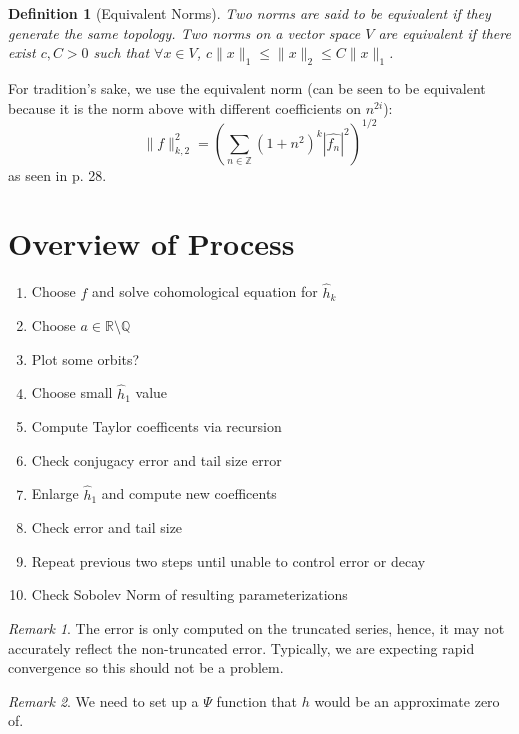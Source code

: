 \documentclass{article}
\newcommand{\Z}{\mathbb{Z}}
\newcommand{\Q}{\mathbb{Q}}
\newcommand{\R}{\mathbb{R}}
\theoremstyle{plain}
\newtheorem*{dfn}{Definition}
\theoremstyle{remark}
\newtheorem*{remark}{Remark}
\begin{document}
\begin{dfn}[Equivalent Norms]
Two norms are said to be equivalent if they generate the same topology. 
Two norms on a vector space $V$ are equivalent if there exist $c,C > 0$ such that $\forall x \in V$, $c\|x\|_1 \leq \|x\|_2 \leq C \| x \|_1$.
\end{dfn}

For tradition's sake, we use the equivalent norm (can be seen to be equivalent because it is the norm above with different coefficients on $n^{2i}$):
\[
\|f\|^2_{k,2} = \left(\sum_{n \in \Z} \left( 1 + n^2 \right)^k \left| \hat{f_n} \right|^2\right)^{1/2}
\]
as seen in \cite{kamtutorial} p. 28. 

\section{Overview of Process}%

\begin{enumerate}[noitemsep, topsep=0pt]
\item Choose $f$ and solve cohomological equation for $\hat{h}_k$
\item Choose $a \in \R \setminus \Q$
\item Plot some orbits?
\item Choose small $\hat{h}_1$ value
\item Compute Taylor coefficents via recursion
\item Check conjugacy error and tail size error
\item Enlarge $\hat{h}_1$ and compute new coefficents
\item Check error and tail size
\item Repeat previous two steps until unable to control error or decay
\item Check Sobolev Norm of resulting parameterizations
\end{enumerate}

\begin{remark}
The error is only computed on the truncated series, hence, it may not accurately reflect the non-truncated error. 
Typically, we are expecting rapid convergence so this should not be a problem.  
\end{remark}

\begin{remark}
We need to set up a $\Psi$ function that $h$ would be an approximate zero of. 
\end{remark}
\end{document}

